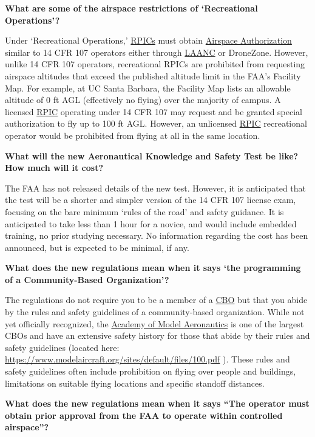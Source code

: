 \documentclass[
]{book}
\begin{document}
\textbf{What are some of the airspace restrictions of `Recreational Operations'?}

Under `Recreational Operations,' \protect\hyperlink{RPIC}{RPICs} must obtain \protect\hyperlink{AA}{Airspace Authorization} similar to 14 CFR 107 operators either through \protect\hyperlink{LAANC}{LAANC} or DroneZone. However, unlike 14 CFR 107 operators, recreational RPICs are prohibited from requesting airspace altitudes that exceed the published altitude limit in the FAA's Facility Map. For example, at UC Santa Barbara, the Facility Map lists an allowable altitude of 0 ft AGL (effectively no flying) over the majority of campus. A licensed \protect\hyperlink{RPIC}{RPIC} operating under 14 CFR 107 may request and be granted special authorization to fly up to 100 ft AGL. However, an unlicensed \protect\hyperlink{RPIC}{RPIC} recreational operator would be prohibited from flying at all in the same location.

\textbf{What will the new Aeronautical Knowledge and Safety Test be like? How much will it cost?}

The FAA has not released details of the new test. However, it is anticipated that the test will be a shorter and simpler version of the 14 CFR 107 license exam, focusing on the bare minimum `rules of the road' and safety guidance. It is anticipated to take less than 1 hour for a novice, and would include embedded training, no prior studying necessary. No information regarding the cost has been announced, but is expected to be minimal, if any.

\textbf{What does the new regulations mean when it says `the programming of a Community-Based Organization'?}

The regulations do not require you to be a member of a \protect\hyperlink{CBO}{CBO} but that you abide by the rules and safety guidelines of a community-based organization. While not yet officially recognized, the \protect\hyperlink{AMA}{Academy of Model Aeronautics} is one of the largest CBOs and have an extensive safety history for those that abide by their rules and safety guidelines (located here: \url{https://www.modelaircraft.org/sites/default/files/100.pdf} ). These rules and safety guidelines often include prohibition on flying over people and buildings, limitations on suitable flying locations and specific standoff distances.

\textbf{What does the new regulations mean when it says ``The operator must obtain prior approval from the FAA to operate within controlled airspace''?}
\end{document}
